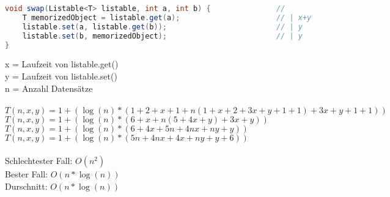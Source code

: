 \documentclass[a4paper, 11pt]{article}
\begin{document}
\begin{lstlisting}[language=java]
void swap(Listable<T> listable, int a, int b) {               //       |
    T memorizedObject = listable.get(a);                      // | x+y |
    listable.set(a, listable.get(b));                         // | y   | 3x+y
    listable.set(b, memorizedObject);                         // | y   |
}
\end{lstlisting}
x = Laufzeit von listable.get() \\
y = Laufzeit von listable.set() \\
n = Anzahl Datensätze \\
\ \\
\( T(n, x, y) = 1 + ( \log(n) * (1 + 2 + x + 1 + n(1 + x + 2 + 3x + y + 1 + 1) + 3x + y + 1 + 1)) \) \\
\( T(n, x, y) = 1 + ( \log(n) * (6 + x + n(5 + 4x + y) + 3x + y)) \) \\
\( T(n, x, y) = 1 + ( \log(n) * (6 + 4x + 5n + 4nx + ny + y)) \) \\
\( T(n, x, y) = 1 + ( \log(n) * (5n + 4nx + 4x + ny + y + 6)) \) \\
\ \\
Schlechtester Fall:      \( O(n^2) \) \\
Bester Fall:             \( O(n * \log(n)) \)   \\
Durschnitt:              \( O(n * \log(n)) \) \\
\end{document}
